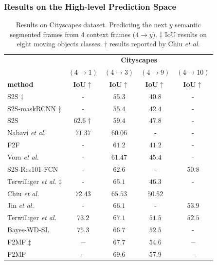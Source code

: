 \subsubsection{Results on the High-level Prediction Space}
\begin{table}[!t]
	\centering
	\footnotesize
	\caption{Results on Cityscapes dataset. Predicting the next $y$ semantic segmented frames from 4 context frames ($4\rightarrow y$). $\ddag$ \ac{IoU} results on eight moving objects classes. $\dag$ results reported by Chiu \textit{et al.} \cite{Chiu2019}}
	\label{table:results_segmenation}
	\begin{tabular} {@{}lcccc@{}} 
		\toprule
		& \multicolumn{4}{c}{\textbf{Cityscapes}} \\ 
		& $(4\rightarrow1)$ & $(4\rightarrow3)$ & $(4\rightarrow9)$ & $(4\rightarrow10)$ \\
		\cmidrule{2-5} 
		\textbf{method} & \textbf{\ac{IoU}}$\uparrow$ & \textbf{\ac{IoU}}$\uparrow$ & \textbf{\ac{IoU}}$\uparrow$ & \textbf{\ac{IoU}}$\uparrow$\\
		\midrule
		S2S \cite{Luc2017}$\ddag$ & - & $55.3$ & $40.8$ & -\\ 
		S2S-maskRCNN \cite{Luc2018}$\ddag$ & - & $55.4$ & $42.4$ & -\\
		S2S \cite{Luc2017} & $62.6\dag$ & $59.4$ & $47.8$ & -\\ 
		Nabavi \textit{et al.} \cite{Nabavi2018} &$71.37$ & $60.06$ & - & - \\ 
		F2F \cite{Luc2018} & - & $61.2$ & $41.2$ & -\\
		Vora \textit{et al.} \cite{Vora2018} & - & $61.47$ & $45.4$ & - \\
		S2S-Res101-FCN \cite{Jin2017a} & - & $62.6$ & - & $50.8$\\
		Terwilliger \textit{et al.} \cite{Terwilliger2019}$\ddag$ & - & $65.1$ & $46.3$ & - \\ 
		Chiu \textit{et al.} \cite{Chiu2019} & $72.43$ & $65.53$ & $50.52$ \\ 
		Jin \textit{et al.} \cite{Jin2017a} & - & $66.1$ & - & $\mathbf{53.9}$\\ 
		Terwilliger \textit{et al.} \cite{Terwilliger2019} & $73.2$ & $67.1$ & $51.5$ & $52.5$ \\
		Bayes-WD-SL \cite{Bhattacharyya2019} & $\mathbf{75.3}$ & $66.7$ & $52.5$ & - \\ 
		F2MF \cite{Saric2020}$\ddag$ & $-$ & $\mathbf{67.7}$ & $\mathbf{54.6}$ & $-$ \\ 
		F2MF \cite{Saric2020} & $-$ & $\mathbf{69.6}$ & $\mathbf{57.9}$ & $-$ \\ 
		\bottomrule
	\end{tabular}
\end{table}
